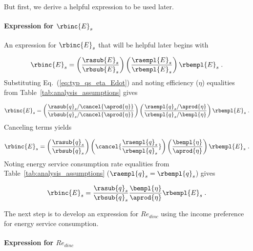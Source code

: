 But first, we derive a helpful expression to be used later.

\paragraph{Expression for $\rbinc{E}_s$}
\label{sec:E_dot_s_hat_expression}

An expression for $\rbinc{E}_s$ that will be helpful later
begins with

\begin{equation}
  \rbinc{E}_s = \left( \frac{\rasub{E}_s}{\rbsub{E}_s} \right)
                \left( \frac{\raempl{E}_s}{\rbempl{E}_s} \right)
                \rbempl{E}_s \; .
\end{equation}
%
Substituting Eq.~(\ref{eq:typ_qs_eta_Edot}) and noting efficiency ($\eta$)
equalities from Table~\ref{tab:analysis_assumptions} gives

\begin{equation}
  \rbinc{E}_s = \left( \frac{\rasub{q}_s / \cancel{\aprod{\eta}}}{\rbsub{q}_s / \cancel{\aprod{\eta}}} \right)
                \left( \frac{\raempl{q}_s / \aprod{\eta}}{\rbempl{q}_s / \bempl{\eta}} \right)
                \rbempl{E}_s \; .
\end{equation}
%
Canceling terms yields

\begin{equation}
  \rbinc{E}_s = \left( \frac{\rasub{q}_s}{\rbsub{q}_s} \right)
                \left( \cancel{\frac{\raempl{q}_s}{\rbempl{q}_s}} \right)
                \left( \frac{\bempl{\eta}}{\aprod{\eta}}  \right)
                \rbempl{E}_s \; .
\end{equation}
%
Noting energy service consumption rate equalities from Table~\ref{tab:analysis_assumptions}
($\raempl{q}_s = \rbempl{q}_s$) gives

\begin{equation} \label{eq:E_dot_s_hat}
  \rbinc{E}_s = \frac{\rasub{q}_s}{\rbsub{q}_s}
                \frac{\bempl{\eta}}{\aprod{\eta}}
                \rbempl{E}_s \; .
\end{equation}

The next step is to develop an expression for $Re_{dinc}$
using the income preference for energy service consumption.


\paragraph{Expression for $Re_{dinc}$}
\label{sec:Re_dinc}

